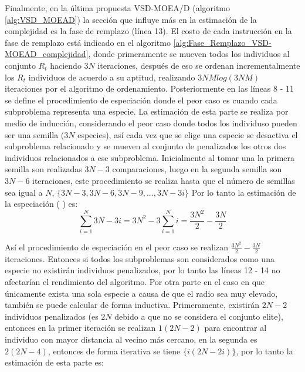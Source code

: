 %
Finalmente, en la última propuesta VSD-MOEA/D (algoritmo \ref{alg:VSD_MOEAD}) la sección que influye más en la estimación de la complejidad es la fase de remplazo (línea 13).
%
El costo de cada instrucción en la fase de remplazo está indicado en el algoritmo \ref{alg:Fase_Remplazo_VSD-MOEAD_complejidad}, donde primeramente se mueven todos los individuos al conjunto $R_t$ haciendo $3N$ iteraciones, después de eso se ordenan incrementalmente los $R_t$ individuos de acuerdo a su aptitud, realizando $3NM log(3NM)$ iteraciones por el algoritmo de ordenamiento.
%
Posteriormente en las líneas 8 - 11 se define el procedimiento de especiación donde el peor caso es cuando cada subproblema representa una especie.
%
La estimación de esta parte se realiza por medio de inducción, considerando el peor caso donde todos los individuso pueden ser una semilla ($3N$ especies), así cada vez que se elige una especie se desactiva el subproblema relacionado y se mueven al conjunto de penalizados los otros dos individuos relacionados a ese subproblema.
%
Inicialmente al tomar una la primera semilla son realizadas $3N-3$ comparaciones, luego en la segunda semilla son $3N-6$ iteraciones, este procedimiento se realiza hasta que el número de semillas sea igual a $N$, $\{3N-3, 3N-6, 3N-9,..., 3N-3i \}$
%
Por lo tanto la estimación de la especiación ( \cite{cormen2009introduction} ) es:
\begin{equation}
\sum_{i=1}^N 3N-3i = 3N^2 - 3 \sum_{i=1}^N i = \frac{3N^2}{2} - \frac{3N}{2}
\end{equation}

Así el procedimiento de especiación en el peor caso se realizan $\frac{3N^2}{2} - \frac{3N}{2}$ iteraciones.
%
Entonces si todos los subproblemas son considerados como una especie no existirán individuos penalizados, por lo tanto las líneas 12 - 14 no afectarían el rendimiento del algoritmo.
%
Por otra parte en el caso en que únicamente exista una sola especie a causa de que el radio sea muy elevado, también se puede calcular de forma inductiva.
%
Primeramente, existirán $2N-2$ individuos penalizados (es $2N$ debido a que no se considera el conjunto elite), entonces en la primer iteración se realizan $1(2N-2)$ para encontrar al individuo con mayor distancia al vecino más cercano, en la segunda es $2(2N-4)$, entonces de forma iterativa se tiene $\{ i(2N-2i) \}$, por lo tanto la estimación de esta parte es:

